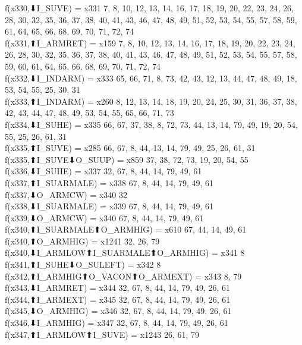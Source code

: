 f(x330,⬇I_SUVE) = x331 {7, 8, 10, 12, 13, 14, 16, 17, 18, 19, 20, 22, 23, 24, 26, 28, 30, 32, 35, 36, 37, 38, 40, 41, 43, 46, 47, 48, 49, 51, 52, 53, 54, 55, 57, 58, 59, 61, 64, 65, 66, 68, 69, 70, 71, 72, 74} \\
f(x331,⬆I_ARMRET) = x159 {7, 8, 10, 12, 13, 14, 16, 17, 18, 19, 20, 22, 23, 24, 26, 28, 30, 32, 35, 36, 37, 38, 40, 41, 43, 46, 47, 48, 49, 51, 52, 53, 54, 55, 57, 58, 59, 60, 61, 64, 65, 66, 68, 69, 70, 71, 72, 74} \\
f(x332,⬇I_INDARM) = x333 {65, 66, 71, 8, 73, 42, 43, 12, 13, 44, 47, 48, 49, 18, 53, 54, 55, 25, 30, 31} \\
f(x333,⬆I_INDARM) = x260 {8, 12, 13, 14, 18, 19, 20, 24, 25, 30, 31, 36, 37, 38, 42, 43, 44, 47, 48, 49, 53, 54, 55, 65, 66, 71, 73} \\
f(x334,⬇I_SUHE) = x335 {66, 67, 37, 38, 8, 72, 73, 44, 13, 14, 79, 49, 19, 20, 54, 55, 25, 26, 61, 31} \\
f(x335,⬆I_SUVE) = x285 {66, 67, 8, 44, 13, 14, 79, 49, 25, 26, 61, 31} \\
f(x335,⬆I_SUVE⬇O_SUUP) = x859 {37, 38, 72, 73, 19, 20, 54, 55} \\
f(x336,⬇I_SUHE) = x337 {32, 67, 8, 44, 14, 79, 49, 61} \\
f(x337,⬆I_SUARMALE) = x338 {67, 8, 44, 14, 79, 49, 61} \\
f(x337,⬇O_ARMCW) = x340 {32} \\
f(x338,⬇I_SUARMALE) = x339 {67, 8, 44, 14, 79, 49, 61} \\
f(x339,⬇O_ARMCW) = x340 {67, 8, 44, 14, 79, 49, 61} \\
f(x340,⬆I_SUARMALE⬆O_ARMHIG) = x610 {67, 44, 14, 49, 61} \\
f(x340,⬆O_ARMHIG) = x1241 {32, 26, 79} \\
f(x340,⬇I_ARMLOW⬆I_SUARMALE⬆O_ARMHIG) = x341 {8} \\
f(x341,⬆I_SUHE⬇O_SULEFT) = x342 {8} \\
f(x342,⬆I_ARMHIG⬆O_VACON⬆O_ARMEXT) = x343 {8, 79} \\
f(x343,⬇I_ARMRET) = x344 {32, 67, 8, 44, 14, 79, 49, 26, 61} \\
f(x344,⬆I_ARMEXT) = x345 {32, 67, 8, 44, 14, 79, 49, 26, 61} \\
f(x345,⬇O_ARMHIG) = x346 {32, 67, 8, 44, 14, 79, 49, 26, 61} \\
f(x346,⬇I_ARMHIG) = x347 {32, 67, 8, 44, 14, 79, 49, 26, 61} \\
f(x347,⬆I_ARMLOW⬆I_SUVE) = x1243 {26, 61, 79} \\
